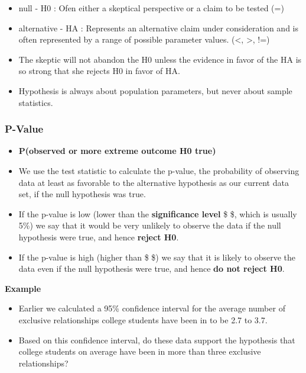 \documentclass[]{book}
\providecommand{\tightlist}{%
  \setlength{\itemsep}{0pt}\setlength{\parskip}{0pt}}
\begin{document}
\begin{itemize}
\tightlist
\item
  null - H0 : Ofen either a skeptical perspective or a claim to be tested (=)
\item
  alternative - HA : Represents an alternative claim under consideration and is often represented by a range of possible parameter values. (\textless{}, \textgreater{}, !=)
\item
  The skeptic will not abandon the H0 unless the evidence in favor of the HA is so strong that she rejects H0 in favor of HA.
\item
  Hypothesis is always about population parameters, but never about sample statistics.
\end{itemize}

\hypertarget{p-value}{%
\subsubsection*{P-Value}\label{p-value}}

\begin{itemize}
\tightlist
\item
  \textbf{P(observed or more extreme outcome \textbar{} H0 true)}
\item
  We use the test statistic to calculate the p-value, the probability of observing data at least as favorable to the alternative hypothesis as our current data set, if the null hypothesis was true.
\item
  If the p-value is low (lower than the \textbf{significance level} \$ \alpha \$, which is usually 5\%) we say that it would be very unlikely to observe the data if the null hypothesis were true, and hence \textbf{reject H0}.
\item
  If the p-value is high (higher than \$ \alpha \$) we say that it is likely to observe the data even if the null
  hypothesis were true, and hence \textbf{do not reject H0}.
\end{itemize}

\textbf{Example}

\begin{itemize}
\tightlist
\item
  Earlier we calculated a 95\% confidence interval for the average number of exclusive relationships college students have been in to be 2.7 to 3.7.
\item
  Based on this confidence interval, do these data support the hypothesis that college students on average have been in more than three exclusive relationships?
\end{itemize}
\end{document}
